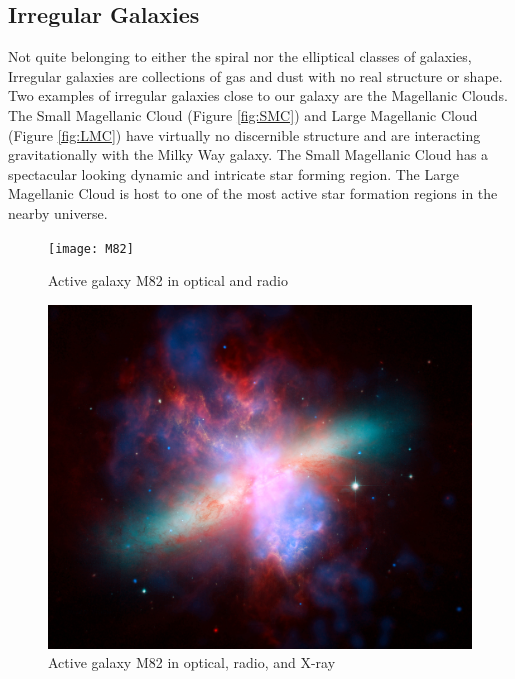 \documentclass[12pt, oneside]{smuthesis}
\begin{document}
\subsection{\sc Irregular Galaxies} \label{irregularGalaxies}

Not quite belonging to either the spiral nor the elliptical classes of galaxies, Irregular galaxies are collections of gas and dust with no real structure or shape. Two examples of irregular galaxies close to our galaxy are the Magellanic Clouds. The Small Magellanic Cloud (Figure \ref{fig:SMC}) and Large Magellanic Cloud (Figure \ref{fig:LMC}) have virtually no discernible structure and are interacting gravitationally with the Milky Way galaxy. The Small Magellanic Cloud has a spectacular looking dynamic and intricate star forming region. The Large Magellanic Cloud is host to one of the most active star formation regions in the nearby universe.

\begin{figure}[H]
	\centering
	\begin{minipage}{0.48\textwidth}
		\centering
		\texttt{[image: M82]}
		\caption{Active galaxy M82 in optical and radio \citep{m82a}}
		\label{fig:M82}
	\end{minipage}
	\begin{minipage}{0.04\textwidth}
		\centering
	\end{minipage}
	\begin{minipage}{0.48\textwidth}
		\centering
		\includegraphics[width=0.87\linewidth]{M82-xray}
		\caption{Active galaxy M82 in optical, radio, and X-ray \citep{m82b}}
		\label{fig:M82-xray}
	\end{minipage}
\end{figure}
\end{document}
